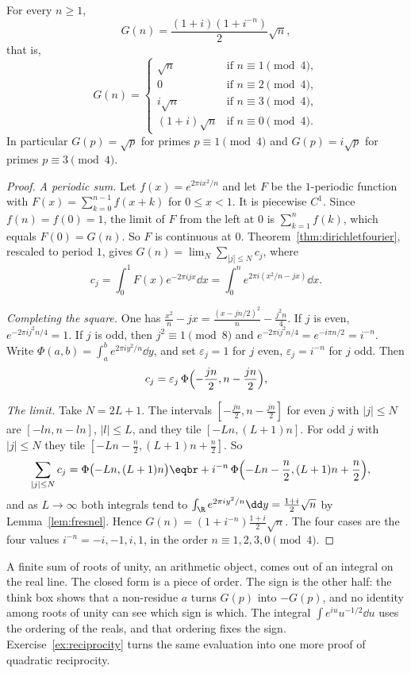 \begin{theorem}[Gauss, 1805]\label{thm:gausssign}
For every $n\ge1$,
\[
G(n)=\frac{(1+i)(1+i^{-n})}2\sqrt n,
\]
that is,
\[
G(n)=\begin{cases}\sqrt n&\text{if }n\equiv1\pmod4,\\0&\text{if }n\equiv2\pmod4,\\i\sqrt n&\text{if }n\equiv3\pmod4,\\(1+i)\sqrt n&\text{if }n\equiv0\pmod4.\end{cases}
\]
In particular $G(p)=\sqrt p$ for primes $p\equiv1\pmod4$ and $G(p)=i\sqrt p$ for primes $p\equiv3\pmod4$.
\end{theorem}
\begin{proof}
\emph{A periodic sum.} Let $f(x)=e^{2\pi ix^2/n}$ and let $F$ be the $1$-periodic function with $F(x)=\sum_{k=0}^{n-1}f(x+k)$ for $0\le x<1$. It is piecewise $C^1$. Since $f(n)=f(0)=1$, the limit of $F$ from the left at $0$ is $\sum_{k=1}^nf(k)$, which equals $F(0)=G(n)$. So $F$ is continuous at $0$. Theorem~\ref{thm:dirichletfourier}, rescaled to period $1$, gives $G(n)=\lim_N\sum_{|j|\le N}c_j$, where
\[
c_j=\int_0^1F(x)e^{-2\pi ijx}\dd x=\int_0^ne^{2\pi i(x^2/n-jx)}\dd x.
\]

\emph{Completing the square.} One has $\frac{x^2}n-jx=\frac{(x-jn/2)^2}n-\frac{j^2n}4$. If $j$ is even, $e^{-2\pi ij^2n/4}=1$. If $j$ is odd, then $j^2\equiv1\pmod8$ and $e^{-2\pi ij^2n/4}=e^{-i\pi n/2}=i^{-n}$. Write $\Phi(a,b)=\int_a^be^{2\pi iy^2/n}\dd y$, and set $\varepsilon_j=1$ for $j$ even, $\varepsilon_j=i^{-n}$ for $j$ odd. Then
\[
c_j=\varepsilon_j\,\Phi\Bigl(-\frac{jn}2,n-\frac{jn}2\Bigr),
\]

\emph{The limit.} Take $N=2L+1$. The intervals $[-\frac{jn}2,n-\frac{jn}2]$ for even $j$ with $|j|\le N$ are $[-ln,n-ln]$, $|l|\le L$, and they tile $[-Ln,(L+1)n]$. For odd $j$ with $|j|\le N$ they tile $[-Ln-\frac n2,(L+1)n+\frac n2]$. So
\[
\begin{aligned}\sum_{|j|\le N}c_j&=\Phi\bigl(-Ln,(L+1)n\bigr)\eqbr+i^{-n}\,\Phi\Bigl(-Ln-\frac n2,(L+1)n+\frac n2\Bigr),\end{aligned}
\]
and as $L\to\infty$ both integrals tend to $\int_{\R}e^{2\pi iy^2/n}\dd y=\frac{1+i}2\sqrt n$ by Lemma~\ref{lem:fresnel}. Hence $G(n)=(1+i^{-n})\frac{1+i}2\sqrt n$. The four cases are the four values $i^{-n}=-i,-1,i,1$, in the order $n\equiv1,2,3,0\pmod4$.
\end{proof}

\begin{beauty}
A finite sum of roots of unity, an arithmetic object, comes out of an integral on the real line. The closed form is a piece of order. The sign is the other half: the think box shows that a non-residue $a$ turns $G(p)$ into $-G(p)$, and no identity among roots of unity can see which sign is which. The integral $\int e^{iu}u^{-1/2}\dd u$ uses the ordering of the reals, and that ordering fixes the sign. Exercise~\ref{ex:reciprocity} turns the same evaluation into one more proof of quadratic reciprocity.
\end{beauty}

